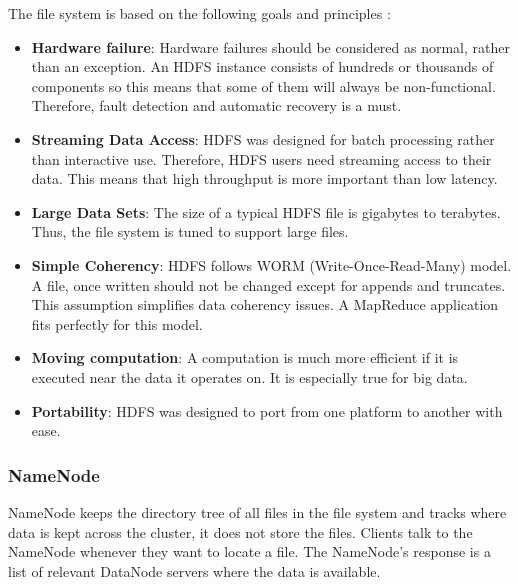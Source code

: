 The file system is based on the following goals and principles \cite{HDFS-docs}:
\begin{itemize}
	\item \textbf{Hardware failure}: Hardware failures should be considered as normal, rather than an exception. An HDFS instance consists of hundreds or thousands of components so this means that some of them will always be non-functional. Therefore, fault detection and automatic recovery is a must.
	\item \textbf{Streaming Data Access}: HDFS was designed for batch processing rather than interactive use. Therefore, HDFS users need streaming access to their data. This means that high throughput is more important than low latency.
	\item \textbf{Large Data Sets}: The size of a typical HDFS file is gigabytes to terabytes. Thus, the file system is tuned to support large files. 
	\item \textbf{Simple Coherency}: HDFS follows WORM (Write-Once-Read-Many) model. A file, once written should not be changed except for appends and truncates.  This assumption simplifies data coherency issues. A MapReduce application fits perfectly for this model.
	\item \textbf{Moving computation}: A computation is much more efficient if it is executed near the data it operates on. It is especially true for big data. 
	\item \textbf{Portability}: HDFS was designed to port from one platform to another with ease. 
\end{itemize}
\subsubsection*{NameNode}
NameNode keeps the directory tree of all files in the file system and tracks where data is kept across the cluster, it does not store the files. Clients talk to the NameNode whenever they want to locate a file. The NameNode's response is a list of relevant DataNode servers where the data is available. 

